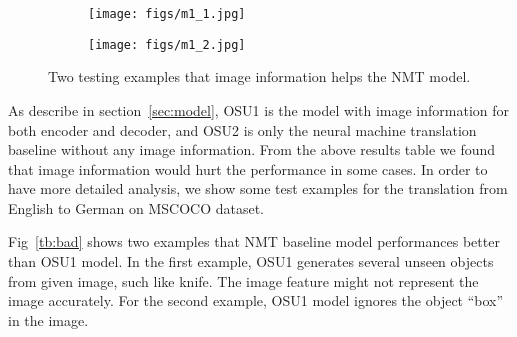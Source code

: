 \begin{figure*}[htbp]
\centering
   \begin{subfigure}[b]{1\textwidth}
   \texttt{[image: figs/m1\_1.jpg]}
   \;
\end{subfigure}

\vspace{3mm}

\begin{subfigure}[b]{1\textwidth}
   \texttt{[image: figs/m1\_2.jpg]}
   \;
\end{subfigure}
\caption{Two testing examples that image information helps the NMT model.}
\label{tb:good}
\end{figure*}

As describe in section~\ref{sec:model}, OSU1 is the model with image information for both encoder 
and decoder, and OSU2 is only the neural machine translation baseline without any image information. 
From the above results table we found that image information would hurt the performance in some cases.
In order to have more detailed analysis, we show some test examples for the translation from English to 
German on MSCOCO dataset. 

Fig~\ref{tb:bad} shows two examples that NMT baseline model performances better than OSU1 model. 
In the first example, OSU1 generates several unseen objects from given image, such like knife. 
The image feature might not represent the image accurately.
For the second example, OSU1 model ignores the object ``box'' in the image.

